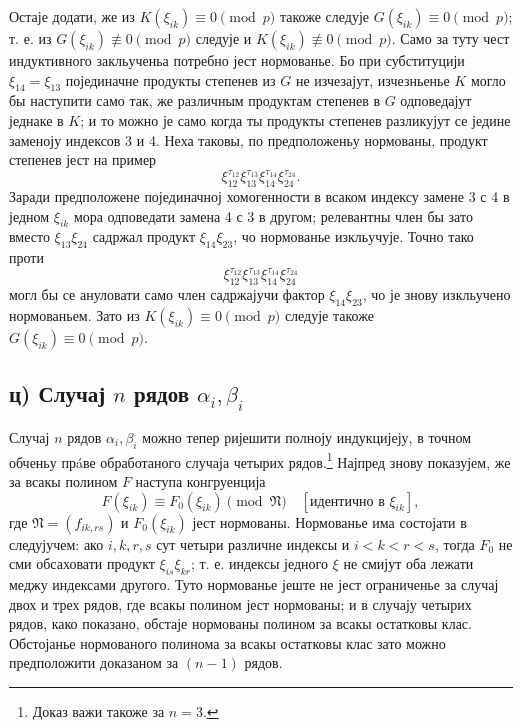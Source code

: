 ﻿\documentclass[11pt]{article}
\providecommand{\frN}{\mathfrak N}
\begin{document}
Остаје додати, же из \(K(\xi_{ik})\equiv0\pmod p\) такоже следује \(G(\xi_{ik})\equiv0\pmod p\); т. е. из \(G(\xi_{ik})\not\equiv0\pmod p\) следује и \(K(\xi_{ik})\not\equiv0\pmod p\). Само за туту чест индуктивного закльученьа потребно јест нормованье. Бо при субституцији \(\xi_{14}=\xi_{13}\) појединачне продукты степенев из \(G\) не изчезајут, изчезньенье \(K\) могло бы наступити само так, же различным продуктам степенев в \(G\) одповедајут једнаке в \(K\); и то можно је само когда ты продукты степенев разликујут се једине заменоју индексов 3 и 4. Неха таковы, по предположеньу нормованы, продукт степенев јест на пример
\[
        \xi_{12}^{\tau_{12}}\xi_{13}^{\tau_{13}}\xi_{14}^{\tau_{14}}\xi_{24}^{\tau_{24}}.
\]
Заради предположене појединачној хомогенности в всаком индексу замене 3 с 4 в једном \(\xi_{ik}\) мора одповедати замена 4 с 3 в другом; релевантны член бы зато вместо \(\xi_{13}\xi_{24}\) садржал продукт \(\xi_{14}\xi_{23}\), чо нормованье изкльучује. Точно тако проти
\[
        \xi_{12}^{\tau_{12}}\xi_{13}^{\tau_{13}}\xi_{14}^{\tau_{14}}\xi_{24}^{\tau_{24}}
\]
могл бы се ануловати само член садржајучи фактор \(\xi_{14}\xi_{23}\), чо је знову изкльучено нормованьем. Зато из \(K(\xi_{ik})\equiv0\pmod p\) следује такоже \(G(\xi_{ik})\equiv0\pmod p\).

\subsection*{ц) Случај \(n\) рядов \(\alpha_i,\beta_i\)}

Случај \(n\) рядов \(\alpha_i,\beta_i\) можно тепер ријешити полноју индукцијеју, в точном обченьу прáве обработаного случаја четырих рядов.\footnote{Доказ важи такоже за \(n=3\).}
Најпред знову показујем, же за всакы полином \(F\) наступа конгруенција
\begin{equation}
        F(\xi_{ik})\equiv F_0(\xi_{ik})\pmod{\frN}\quad [\text{идентично в \(\xi_{ik}\)}],
\end{equation}
где \(\frN=(f_{ik,rs})\) и \(F_0(\xi_{ik})\) јест нормованы. Нормованье има состојати в следујучем: ако \(i,k,r,s\) сут четыри различне индексы и \(i<k<r<s\), тогда \(F_0\) не сми обсаховати продукт \(\xi_{is}\xi_{kr}\); т. е. индексы једного \(\xi\) не смијут оба лежати меджу индексами другого. Туто нормованье јеште не јест ограниченье за случај двох и трех рядов, где всакы полином јест нормованы; и в случају четырих рядов, како показано, обстаје нормованы полином за всакы остатковы клас. Обстојанье нормованого полинома за всакы остатковы клас зато можно предположити доказаном за \((n-1)\) рядов.
\end{document}
